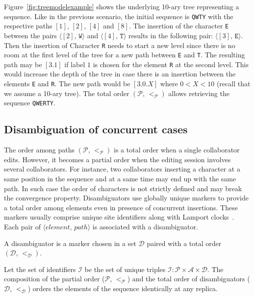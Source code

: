 Figure~\ref{fig:treemodelexample} shows the underlying 10-ary tree representing
a sequence. Like in the previous scenario, the initial sequence is \texttt{QWTY}
with the respective paths $[1]$, $[2]$, $[4]$ and $[8]$. The insertion of the
character \texttt{E} between the pairs $\langle [2],\, \texttt{W}\rangle$ and
$\langle [4],\, \texttt{T}\rangle$ results in the following pair:
$\langle [3],\, \texttt{E} \rangle$. Then the insertion of Character \texttt{R}
needs to start a new level since there is no room at the first level of the tree
for a new path between \texttt{E} and \texttt{T}. The resulting path may be
$[3.1]$ if label $1$ is chosen for the element \texttt{R} at the second
level. This would increase the depth of the tree in case there is an insertion
between the elements \texttt{E} and \texttt{R}. The new path would be $[3.0.X]$
where $0<X<10$ (recall that we assume a 10-ary tree). The total order
$(\mathcal{P},\,<_\mathcal{P})$ allows retrieving the sequence \texttt{QWERTY}.

\subsection{Disambiguation of concurrent cases}
\label{subsec:disambiguation}

The order among paths $(\mathcal{P},\,<_\mathcal{P})$ is a total order when a
single collaborator edits. However, it becomes a partial order when the editing
session involves several collaborators. For instance, two collaborators
inserting a character at a same position in the sequence and at a same time may
end up with the same path. In such case the order of characters is not strictly
defined and may break the convergence property. Disambiguators use globally
unique markers to provide a total order among elements even in presence of
concurrent insertions. These markers usually comprise unique site identifiers
along with Lamport clocks~\cite{lamport1978time}. Each pair of
$\langle element,\,path\rangle$ is associated with a disambiguator.

\begin{definition}[Disambiguator]
  A disambiguator is a marker chosen in a set $\mathcal{D}$ paired with a total
  order $(\mathcal{D},\, <_\mathcal{D})$.
\end{definition}

Let the set of identifiers $\mathcal{I}$ be the set of unique triples
$\mathcal{I}:\mathcal{P}\times \mathcal{A}\times \mathcal{D}$. The composition
of the partial order ($\mathcal{P}$, $<_{\mathcal{P}}$) and the total order of
disambiguators ($\mathcal{D}$, $<_{\mathcal{D}}$) orders the elements of the
sequence identically at any replica.

